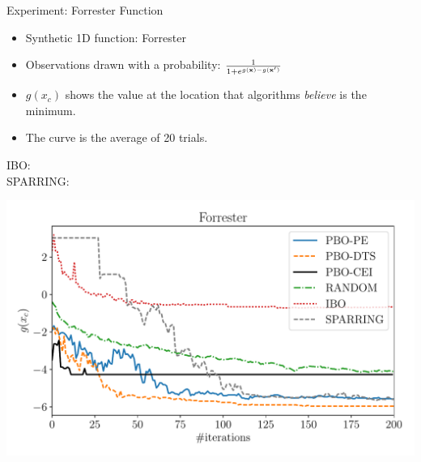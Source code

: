 \documentclass[13pt,aspectratio=1610]{beamer}
\begin{document}
\begin{frame}{Experiment: Forrester Function}
\begin{minipage}{0.36\textwidth}
\begin{itemize}
\item Synthetic 1D function: Forrester
\item Observations drawn with a probability: 
$ \frac1{1+e^{g(\mathbf{x})-g(\mathbf{x}')}}$
\item $g(x_c)$ shows the value at the location that algorithms \emph{believe} is the minimum.
\item The curve is the average of 20 trials.
\end{itemize}

\begin{flushleft}
\tiny
IBO: \citep{Brochu:2010}\\
SPARRING: \citep{AilonKJ14}
\end{flushleft}
\end{minipage}
%
\begin{minipage}{.63\textwidth}
\includegraphics[width=1.\textwidth]{results_forrester_new.pdf}
\end{minipage}
\end{frame}
\end{document}
